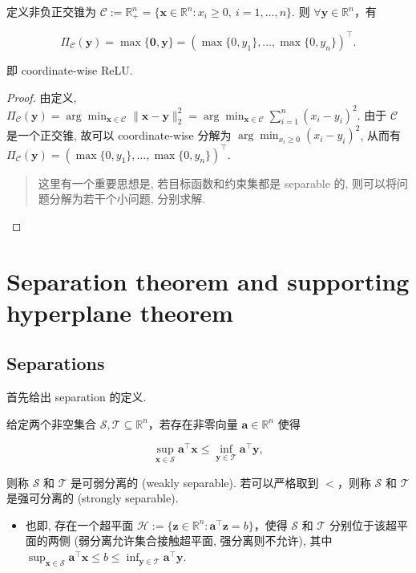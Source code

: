 \begin{exampleblock}
定义非负正交锥为 $\mathcal{C} := \mathbb{R}_+^n = \{\bm{x} \in \mathbb{R}^n: x_i \geq 0,~ i=1,\dots,n\}$. 则 $\forall \bm{y} \in \mathbb{R}^n$，有

\[
\Pi_{\mathcal{C}}(\bm{y}) = \max\{\bm{0}, \bm{y}\} = \left(\max\{0, y_1\}, \dots, \max\{0, y_n\}\right)^\top.
\]

即 coordinate-wise ReLU.


\begin{proof}{}
由定义, $\Pi_{\mathcal{C}}(\bm{y}) = \arg\min_{\bm{x} \in \mathcal{C}} \|\bm{x}-\bm{y}\|_2^2 = \arg\min_{\bm{x} \in \mathcal{C}} \sum_{i=1}^n (x_i - y_i)^2$. 由于 $\mathcal{C}$ 是一个正交锥, 故可以 coordinate-wise 分解为 $\arg\min_{x_i \geq 0} (x_i - y_i)^2$, 从而有 $\Pi_{\mathcal{C}}(\bm{y}) = (\max\{0, y_1\}, \dots, \max\{0, y_n\})^\top$.

\begin{quote}
这里有一个重要思想是, 若目标函数和约束集都是 separable 的, 则可以将问题分解为若干个小问题, 分别求解.

\end{quote}

\end{proof}

\end{exampleblock}

\section{Separation theorem and supporting hyperplane theorem}

\subsection{Separations}

首先给出 separation 的定义.


\begin{defblock}
给定两个非空集合 $\mathcal{S}, \mathcal{T} \subseteq \mathbb{R}^n$，若存在非零向量 $\bm{a} \in \mathbb{R}^n$ 使得

\[
\sup_{\bm{x} \in \mathcal{S}} \bm{a}^\top \bm{x} \leq \inf_{\bm{y} \in \mathcal{T}} \bm{a}^\top \bm{y},
\]

则称 $\mathcal{S}$ 和 $\mathcal{T}$ 是可弱分离的 (weakly separable). 若可以严格取到 $<$，则称 $\mathcal{S}$ 和 $\mathcal{T}$ 是强可分离的 (strongly separable).

\begin{itemize}
\item {}也即, 存在一个超平面 $\mathcal{H}:=\{\bm{z} \in \mathbb{R}^n: \bm{a}^\top \bm{z} = b\}$，使得 $\mathcal{S}$ 和 $\mathcal{T}$ 分别位于该超平面的两侧 (弱分离允许集合接触超平面, 强分离则不允许), 其中 $\sup_{\bm{x} \in \mathcal{S}} \bm{a}^\top \bm{x} \leq b \leq \inf_{\bm{y} \in \mathcal{T}} \bm{a}^\top \bm{y}$.


\end{itemize}

\end{defblock}

